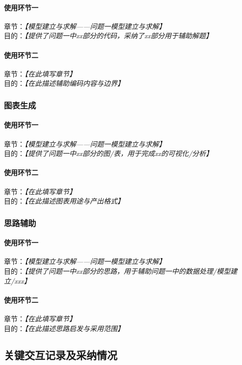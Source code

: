 \documentclass[12pt]{ctexart}
\newcommand{\ph}[1]{\textit{【#1】}}
\begin{document}
\paragraph{使用环节一}
章节：\ph{模型建立与求解——问题一模型建立与求解} \\
目的：\ph{提供了问题一中xx部分的代码，采纳了xx部分用于辅助解题}

\paragraph{使用环节二}
章节：\ph{在此填写章节} \\
目的：\ph{在此描述辅助编码内容与边界}

\subsubsection{图表生成}
\paragraph{使用环节一}
章节：\ph{模型建立与求解——问题一模型建立与求解} \\
目的：\ph{提供了问题一中xx部分的图/表，用于完成xx的可视化/分析}

\paragraph{使用环节二}
章节：\ph{在此填写章节} \\
目的：\ph{在此描述图表用途与产出格式}

\subsubsection{思路辅助}
\paragraph{使用环节一}
章节：\ph{模型建立与求解——问题一模型建立与求解} \\
目的：\ph{提供了问题一中xx部分的思路，用于辅助问题一中的数据处理/模型建立/xxx}

\paragraph{使用环节二}
章节：\ph{在此填写章节} \\
目的：\ph{在此描述思路启发与采用范围}

\subsection{关键交互记录及采纳情况}
\end{document}

